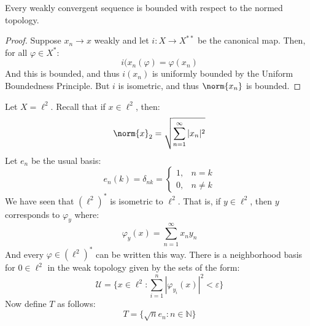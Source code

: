     \begin{theorem}
        Every weakly convergent sequence is bounded with
        respect to the normed topology.
    \end{theorem}
    \begin{proof}
        Suppose $x_{n}\rightarrow{x}$ weakly and let
        $i:X\rightarrow{X}^{**}$ be the canonical map. Then,
        for all $\varphi\in{X}^{*}$:
        \begin{equation}
            i(x_{n}(\varphi)=\varphi(x_{n})
        \end{equation}
        And this is bounded, and thus
        $i(x_{n})$ is uniformly bounded by the Uniform
        Boundedness Principle. But $i$ is isometric, and
        thus $\norm{x_{n}}$ is bounded.
    \end{proof}
    \begin{lexample}
        Let $X=\ell^{2}$. Recall that if $x\in\ell^{2}$, then:
        \begin{equation}
            \norm{x}_{2}=
                \sqrt{\sum_{n=1}^{\infty}|x_{n}|^{2}}
        \end{equation}
        Let $e_{n}$ be the usual basis:
        \begin{equation}
            e_{n}(k)=\delta_{nk}=
                \begin{cases}
                    1,&n=k\\
                    0,&n\ne{k}
                \end{cases}
        \end{equation}
        We have seen that $(\ell^{2})^{*}$ is isometric to
        $\ell^{2}$. That is, if $y\in\ell^{2}$, then
        $y$ corresponds to $\varphi_{y}$ where:
        \begin{equation}
            \varphi_{y}(x)=\sum_{n=1}^{\infty}
                x_{n}y_{n}
        \end{equation}
        And every $\varphi\in(\ell^{2})^{*}$ can be written
        this way. There is a neighborhood basis for
        $0\in\ell^{2}$ in the weak topology given by the
        sets of the form:
        \begin{equation}
            \mathcal{U}=\{x\in\ell^{2}:
                \sum_{i=1}^{n}|\varphi_{y_{i}}(x)|^{2}
                <\varepsilon\}
        \end{equation}
        Now define $T$ as follows:
        \begin{equation}
            T=\{\sqrt{n}e_{n}:n\in\mathbb{N}\}
        \end{equation}

\end{lexample}

